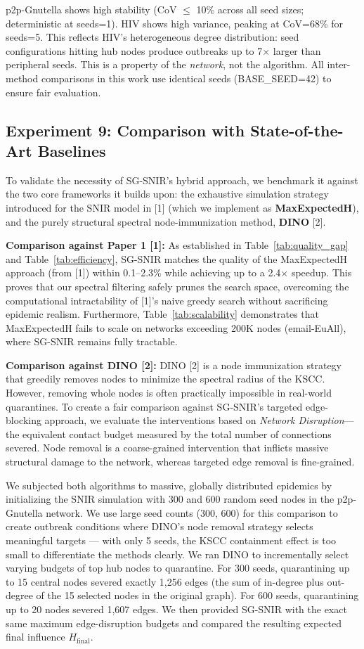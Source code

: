 \documentclass[conference]{IEEEtran}
\begin{document}
p2p-Gnutella shows high stability (CoV $\leq$ 10\% across all seed sizes; deterministic at seeds=1). HIV shows high variance, peaking at CoV=68\% for seeds=5. This reflects HIV's heterogeneous degree distribution: seed configurations hitting hub nodes produce outbreaks up to 7$\times$ larger than peripheral seeds. This is a property of the \emph{network}, not the algorithm. All inter-method comparisons in this work use identical seeds (BASE\_SEED=42) to ensure fair evaluation.

\subsection{Experiment 9: Comparison with State-of-the-Art Baselines}
To validate the necessity of SG-SNIR's hybrid approach, we benchmark it against the two core frameworks it builds upon: the exhaustive simulation strategy introduced for the SNIR model in [1] (which we implement as \textbf{MaxExpectedH}), and the purely structural spectral node-immunization method, \textbf{DINO} [2].

\textbf{Comparison against Paper 1 [1]:} As established in Table~\ref{tab:quality_gap} and Table~\ref{tab:efficiency}, SG-SNIR matches the quality of the MaxExpectedH approach (from [1]) within 0.1--2.3\% while achieving up to a 2.4$\times$ speedup. This proves that our spectral filtering safely prunes the search space, overcoming the computational intractability of [1]'s naive greedy search without sacrificing epidemic realism. Furthermore, Table~\ref{tab:scalability} demonstrates that MaxExpectedH fails to scale on networks exceeding 200K nodes (email-EuAll), where SG-SNIR remains fully tractable.

\textbf{Comparison against DINO [2]:} DINO [2] is a node immunization strategy that greedily removes nodes to minimize the spectral radius of the KSCC. However, removing whole nodes is often practically impossible in real-world quarantines. To create a fair comparison against SG-SNIR's targeted edge-blocking approach, we evaluate the interventions based on \emph{Network Disruption}---the equivalent contact budget measured by the total number of connections severed. Node removal is a coarse-grained intervention that inflicts massive structural damage to the network, whereas targeted edge removal is fine-grained. 

We subjected both algorithms to massive, globally distributed epidemics by initializing the SNIR simulation with 300 and 600 random seed nodes in the p2p-Gnutella network. We use large seed counts (300, 600) for this comparison to create outbreak conditions where DINO's node removal strategy selects meaningful targets --- with only 5 seeds, the KSCC containment effect is too small to differentiate the methods clearly. We ran DINO to incrementally select varying budgets of top hub nodes to quarantine. For 300 seeds, quarantining up to 15 central nodes severed exactly 1,256 edges (the sum of in-degree plus out-degree of the 15 selected nodes in the original graph). For 600 seeds, quarantining up to 20 nodes severed 1,607 edges. We then provided SG-SNIR with the exact same maximum edge-disruption budgets and compared the resulting expected final influence $H_{\text{final}}$.
\end{document}
